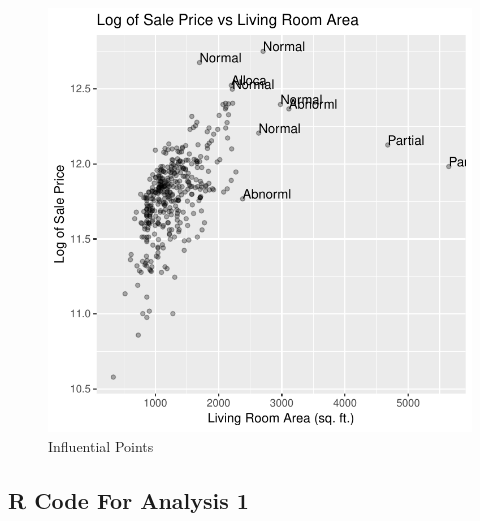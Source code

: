 \documentclass[american,]{article}
\begin{document}
\begin{figure}[htbp]

{\centering \includegraphics[width=0.5\linewidth]{HousePriceRegressionAnalysis_files/figure-latex/infleu-points-1} 

}

\caption{Influential Points}\label{fig:infleu-points}
\end{figure}

\hypertarget{r-code-for-analysis-1}{%
\subsection{R Code For Analysis 1}\label{r-code-for-analysis-1}}
\end{document}
